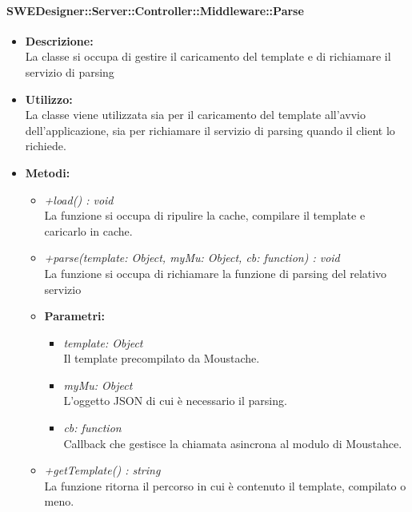       \paragraph{SWEDesigner::Server::Controller::Middleware::Parse}
        \begin{itemize}
          \item \textbf{Descrizione: }\\
          La classe si occupa di gestire il caricamento del template e di richiamare il servizio di parsing
          \item \textbf{Utilizzo: }\\
          La classe viene utilizzata sia per il caricamento del template all'avvio dell'applicazione, sia per richiamare il servizio di parsing quando il client lo richiede.
          \item \textbf{Metodi: }\\
          \begin{itemize}
            \item \emph{+load() : void}\\
            La funzione si occupa di ripulire la cache, compilare il template e caricarlo in cache.
            \item \emph{+parse(template: Object, myMu: Object, cb: function) : void}\\
            La funzione si occupa di richiamare la funzione di parsing del relativo servizio
            \item \textbf{Parametri: }\\
            \begin{itemize}
              \item \emph{template: Object}\\
              Il template precompilato da Moustache.
              \item \emph{myMu: Object}\\
              L'oggetto JSON di cui è necessario il parsing.
              \item \emph{cb: function}\\
              Callback che gestisce la chiamata asincrona al modulo di Moustahce.
            \end{itemize}
            \item \emph{+getTemplate() : string}\\
            La funzione ritorna il percorso in cui è contenuto il template, compilato o meno.
          \end{itemize}
        \end{itemize}
